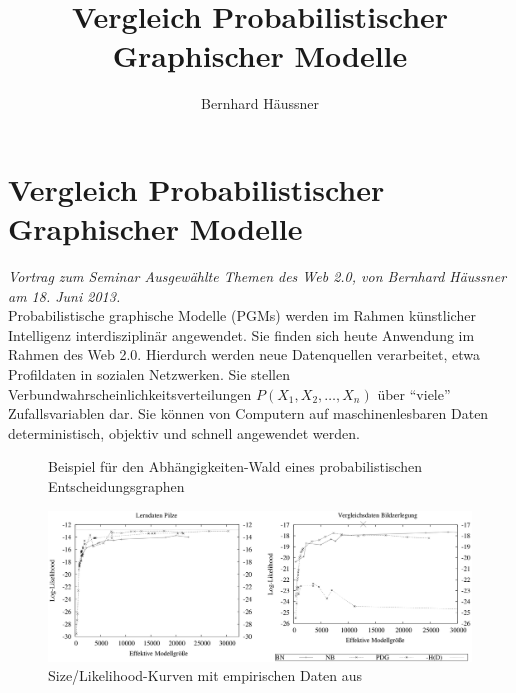 \documentclass[a4paper,10pt,oneside]{scrartcl}
\title{Vergleich Probabilistischer Graphischer Modelle}
\author{Bernhard Häussner}
\begin{document}
\section*{Vergleich Probabilistischer Graphischer Modelle}

\textit{Vortrag zum Seminar Ausgewählte Themen des Web 2.0, von Bernhard Häussner am 18. Juni 2013.  }\\

Probabilistische graphische Modelle (PGMs)\cite{koller2009probabilistic} werden im Rahmen künstlicher Intelligenz interdisziplinär angewendet. Sie finden sich heute Anwendung im Rahmen des Web 2.0. Hierdurch werden neue Datenquellen verarbeitet, etwa Profildaten in sozialen Netzwerken. Sie stellen Verbundwahrscheinlichkeitsverteilungen $P(X_1,X_2,\dots,X_n)$ über "`viele"' Zufallsvariablen dar. Sie können von Computern auf maschinenlesbaren Daten deterministisch, objektiv und schnell angewendet werden.

\begin{minipage}{0.25\textwidth}
\centering
\begin{figure}[H]
\caption{\label{fig:pdgforest}Beispiel für den Abhängigkeiten-Wald eines probabilistischen Entscheidungsgraphen}
\end{figure}
\end{minipage}\hfill
\begin{minipage}{0.65\textwidth}
\centering
\begin{figure}[H]
  \caption{\label{fig:datagraphs}Size/Likelihood-Kurven mit empirischen Daten aus \cite{nielsen2006empirical}}
  \centering
  \includegraphics{graphs.png}
\end{figure}
\end{minipage}
\end{document}
